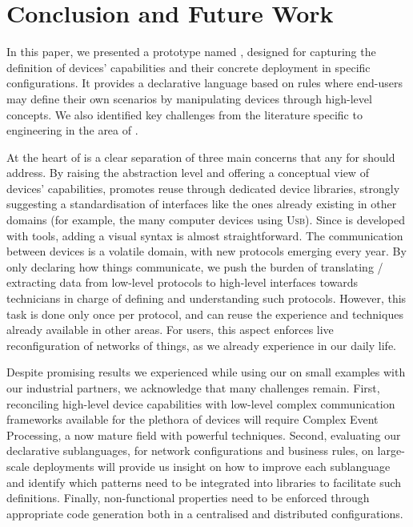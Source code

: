 \section{Conclusion and Future Work}
\label{sec:Conclusion}

In this paper, we presented a prototype \DSL named \IOTDSL, designed for capturing the definition of devices' capabilities and their concrete deployment in specific configurations. It provides a declarative language based on rules where end-users may define their own scenarios by manipulating devices through high-level concepts. We also identified key challenges from the literature specific to \DSL engineering in the area of \IOT. 

At the heart of \IOTDSL is a clear separation of three main concerns that any \DSL for \IOT should address. By raising the abstraction level and offering a conceptual view of devices' capabilities, \IOTDSL promotes reuse through dedicated device libraries, strongly suggesting a standardisation of interfaces like the ones already existing in other domains (for example, the many computer devices using \textsc{Usb}). Since \IOTDSL is developed with \MDE tools, adding a visual syntax is almost straightforward. The communication between devices is a volatile domain, with new protocols emerging every year. By only declaring how things communicate, we push the burden of translating / extracting data from low-level protocols to high-level interfaces towards technicians in charge of defining and understanding such protocols. However, this task is done only once per protocol, and can reuse the experience and techniques already available in other areas. For users, this aspect enforces live reconfiguration of networks of things, as we already experience in our daily life. 

Despite promising results we experienced while using our \DSL on small examples with our industrial partners, we acknowledge that many challenges remain. First, reconciling high-level device capabilities with low-level complex communication frameworks available for the plethora of devices will require Complex Event Processing, a now mature field with powerful techniques. Second, evaluating our declarative sublanguages, for network configurations and business rules, on large-scale deployments will provide us insight on how to improve each sublanguage and identify which patterns need to be integrated into libraries to facilitate such definitions. Finally, non-functional properties need to be enforced through appropriate code generation both in a centralised and distributed configurations.
